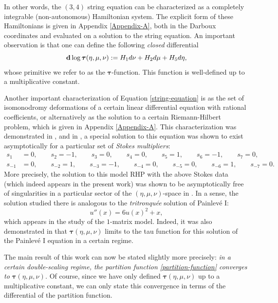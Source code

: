 \documentclass[usenames,dvipsnames]{article}
\theoremstyle{definition}
\numberwithin{equation}{section}
\numberwithin{figure}{section}
\begin{document}
In other words, the $(3,4)$ string equation can be characterized as a completely integrable (non-autonomous) Hamiltonian system. The explicit form of these Hamiltonians is given in Appendix \ref{Appendix-A}, both in the Darboux coordinates and evaluated on a solution to the string equation. An important observation is that one can define the following \textit{closed} differential
    \begin{equation}
        {\bf d}\log\boldsymbol{\tau}(\eta,\mu,\nu) := H_1 d\nu + H_2 d\mu + H_5d\eta,
    \end{equation}
whose primitive we refer to as the $\boldsymbol{\tau}$-function. This function is well-defined up to a multiplicative constant. 

Another important characterization of Equation \eqref{string-equation} is as the set of isomonodromy deformations of a certain linear differential equation with rational coefficients, or alternatively as the solution to a certain Riemann-Hilbert problem, which is given in Appendix \ref{Appendix-A}. This characterization was demonstrated in \cite{DHL2}, and in \cite{Nathan1}, a special solution to this equation was shown to exist asymptotically for a particular set of \textit{Stokes multipliers}:
    \begin{align}
        s_1 &= 0,\qquad s_2 = -1,\qquad s_3 = 0,\qquad s_4 = 0,\qquad s_5 = 1,\qquad s_6 = -1, \qquad s_7 = 0,\nonumber\\
        s_{-1} &= 0,\qquad s_{-2} = 1,\qquad s_{-3} = -1,\qquad s_{-4} = 0,\qquad s_{-5} = 0,\qquad s_{-6} = 1,\qquad s_{-7} = 0.
    \end{align}
More precisely, the solution to this model RHP with the above Stokes data (which indeed appears in the present work) was shown to be asymptotically free of singularities in a particular sector of the $(\eta,\mu,\nu)$-space in \cite{Nathan1}. In a sense, the solution studied there is analogous to the \textit{tritronqu\'{e}e} solution of Painlev\'{e} I:
    \begin{equation}
        u''(x) = 6u(x)^2 + x,
    \end{equation}
which appears in the study of the $1$-matrix model. Indeed, it was also demonstrated in \cite{Nathan1} that $\boldsymbol{\tau}(\eta,\mu,\nu)$ limits to the tau function for this solution of the Painlev\'{e} I equation in a certain regime.

The main result of this work can now be stated slightly more precisely: \textit{in a certain double-scaling regime, the partition function \eqref{partition-function} converges to $\boldsymbol{\tau}(\eta,\mu,\nu)$.} Of course, since we have only defined $\boldsymbol{\tau}(\eta,\mu,\nu)$ up to a multiplicative constant, we can only state this convergence in terms of the differential of the partition function.
\end{document}
